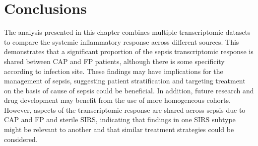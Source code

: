 \section{Conclusions}

The analysis presented in this chapter combines multiple transcriptomic datasets to compare the systemic inflammatory response across different sources. This demonstrates that a significant proportion of the sepsis transcriptomic response is shared between CAP and FP patients, although there is some specificity according to infection site. These findings may have implications for the management of sepsis, suggesting patient stratification and targeting treatment on the basis of cause of sepsis could be beneficial. In addition, future research and drug development may benefit from the use of more homogeneous cohorts. However, aspects of the transcriptomic response are shared across sepsis due to CAP and FP and sterile SIRS, indicating that findings in one SIRS subtype might be relevant to another and that similar treatment strategies could be considered. 